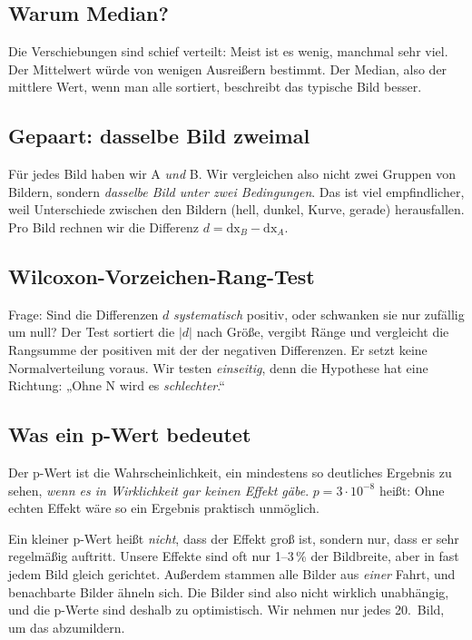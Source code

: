 \documentclass[11pt,a4paper]{article}
\begin{document}
\subsection{Warum Median?}

Die Verschiebungen sind schief verteilt: Meist ist es wenig, manchmal sehr viel. Der Mittelwert
würde von wenigen Ausreißern bestimmt. Der Median, also der mittlere Wert, wenn man alle
sortiert, beschreibt das typische Bild besser.

\subsection{Gepaart: dasselbe Bild zweimal}

Für jedes Bild haben wir A \emph{und} B. Wir vergleichen also nicht zwei Gruppen von Bildern,
sondern \emph{dasselbe Bild unter zwei Bedingungen}. Das ist viel empfindlicher, weil
Unterschiede zwischen den Bildern (hell, dunkel, Kurve, gerade) herausfallen. Pro Bild rechnen
wir die Differenz $d = \text{dx}_B - \text{dx}_A$.

\subsection{Wilcoxon-Vorzeichen-Rang-Test}

Frage: Sind die Differenzen $d$ \emph{systematisch} positiv, oder schwanken sie nur zufällig um
null? Der Test sortiert die $|d|$ nach Größe, vergibt Ränge und vergleicht die Rangsumme der
positiven mit der der negativen Differenzen. Er setzt keine Normalverteilung voraus. Wir testen
\emph{einseitig}, denn die Hypothese hat eine Richtung: „Ohne N wird es \emph{schlechter}.“

\subsection{Was ein p-Wert bedeutet}

Der p-Wert ist die Wahrscheinlichkeit, ein mindestens so deutliches Ergebnis zu sehen,
\emph{wenn es in Wirklichkeit gar keinen Effekt gäbe}. $p = 3\cdot10^{-8}$ heißt: Ohne echten
Effekt wäre so ein Ergebnis praktisch unmöglich.

\begin{achtung}
Ein kleiner p-Wert heißt \emph{nicht}, dass der Effekt groß ist, sondern nur, dass er sehr
regelmäßig auftritt. Unsere Effekte sind oft nur 1--3\,\% der Bildbreite, aber in fast jedem Bild
gleich gerichtet. Außerdem stammen alle Bilder aus \emph{einer} Fahrt, und benachbarte Bilder
ähneln sich. Die Bilder sind also nicht wirklich unabhängig, und die p-Werte sind deshalb zu
optimistisch. Wir nehmen nur jedes 20.\ Bild, um das abzumildern.
\end{achtung}
\end{document}
